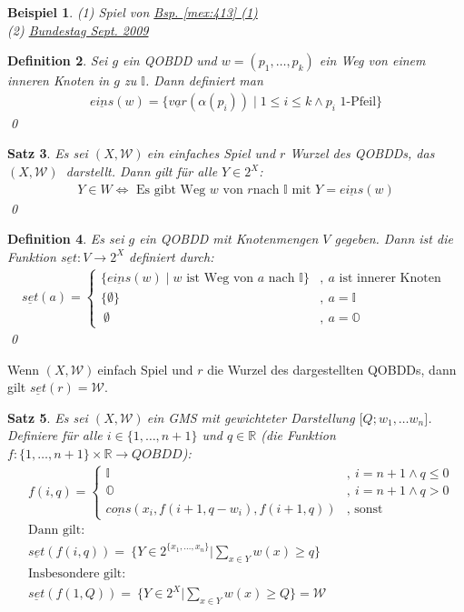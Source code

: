 \documentclass[ngerman]{scrartcl}
\theoremstyle{custom}
\newtheorem{mdef}{Definition} \numberwithin{mdef}{subsection}
\newtheorem{mex}[mdef]{Beispiel}
\newtheorem{ms}[mdef]{Satz}
\newcommand{\0}{\mathbf{0}}
\newcommand{\1}{\mathbf{L}}
\newcommand{\var}{\underline{var}}
\newcommand{\eins}{\underline{eins}}
\newcommand{\set}{\underline{set}}
\newcommand{\cons}{\underline{cons}}
\newcommand{\sg}{$(X,\mathcal{W})~$}
\newcommand{\gms}{$\lbrack Q; w_1, \dots w_n \rbrack$}
\begin{document}
\begin{mex}
(1) Spiel von \hyperref[mex:413]{Bsp. \ref{mex:413} (1)}\\
(2) \hyperref[mex:413]{Bundestag Sept. 2009}
\end{mex}

\begin{mdef}
Sei $g$ ein QOBDD und $w = (p_1, \dots, p_k)$ ein Weg von einem
inneren Knoten in $g$ zu $\mathds{I}$. Dann definiert man
\begin{align*}
\underline{eins}(w) = \{\var(\alpha(p_i)) \mid 1 \leq i \leq k \wedge
p_i \text{ 1-Pfeil}\}
\end{align*}
\qed
\end{mdef}

\begin{ms}
Es sei \sg ein einfaches Spiel und $r$ Wurzel des QOBDDs, das \sg
darstellt. Dann gilt f\"ur alle $Y \in 2^X$:
\begin{align*}
Y \in W \Leftrightarrow \text{ Es gibt Weg } w \text{ von } r \text{
  nach } \mathds{I} \text{ mit } Y = \underline{eins}(w)
\end{align*}
\qed
\end{ms}

\begin{mdef}
Es sei $g$ ein QOBDD mit Knotenmengen $V$ gegeben. Dann ist die
Funktion $\underline{set}:V \rightarrow 2^X$ definiert durch:
\begin{align*}
  \set(a) = \begin{cases} \{\eins(w) \mid w \text{ ist Weg von } a
    \text{ nach } \mathds{I} \} &,~ a \text{ ist innerer Knoten }\\
    \{\emptyset\} &,~ a = \mathds{I}\\
    ~\emptyset &,~ a = \mathds{O}
  \end{cases}
\end{align*}
\qed
\end{mdef}
Wenn \sg einfach Spiel und $r$ die Wurzel des dargestellten QOBDDs,
dann gilt $\set(r) = \mathcal{W}$.

\begin{ms}
Es sei \sg ein GMS mit gewichteter Darstellung \gms. Definiere f\"ur
alle $i \in \{1, \dots, n+1\}$ und $q \in \mathds{R}$ (die Funktion
$f:\{1, \dots, n+1\} \times \mathds{R} \rightarrow QOBDD$):
\begin{align*}
&f(i,q) = \begin{cases}
\mathds{I} &,~ i = n+1 \wedge q \leq 0\\
\mathds{O} &,~ i = n+1 \wedge q > 0\\
\cons(x_i, f(i+1, q-w_i), f(i+1, q)) &,\text{ sonst }
\end{cases}\\
&\text{Dann gilt:}\\
&\set(f(i,q)) = ~\biggr \{ Y \in 2^{\{x_1,\dots,x_n\}} \biggr \vert \sum_{x \in Y} w(x)
\geq q \biggr\}\\
&\text{Insbesondere gilt:}\\
&\set(f(1,Q))= ~\biggr\{Y \in 2^X \biggr \vert \sum_{x \in Y} w(x) \geq
Q \biggr \} = \mathcal{W}
\end{align*}
\end{ms}
\end{document}
